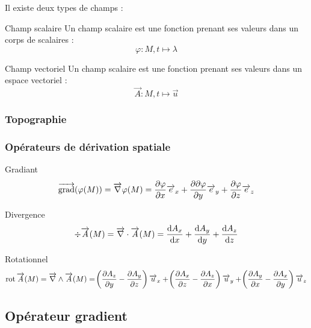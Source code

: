 \documentclass[a4paper,french,bookmarks]{book}
\begin{document}
    Il existe deux types de champs :
    
    \begin{definition}{Champ scalaire}{}
        Un champ scalaire est une fonction prenant ses valeurs dans un corps de scalaires :
        \[ \varphi : M, t \mapsto \lambda \]
    \end{definition}
    
    \begin{definition}{Champ vectoriel}{}
        Un champ scalaire est une fonction prenant ses valeurs dans un espace vectoriel :
        \[ \vec{A} : M, t \mapsto \vec{u} \]
    \end{definition}
    
    \subsubsection{Topographie}
    
    \subsubsection{Opérateurs de dérivation spatiale}
    
    \begin{definition}{Gradiant}{}
        \[ \overrightarrow{\operatorname{grad}}\!\left(\varphi\!\left(M\right)\right) = \overrightarrow{\nabla}\varphi\!\left(M\right) = \dfrac{\partial \varphi}{\partial x}\overrightarrow{e}_x + \dfrac{\partial \partial \varphi}{\partial y}\overrightarrow{e}_y + \dfrac{\partial \varphi}{\partial z}\overrightarrow{e}_z \]
    \end{definition}
    
    \begin{definition}{Divergence}{}
        \[ \div\overrightarrow{A}\!\left(M\right) = \overrightarrow{\nabla} \cdot \overrightarrow{A}\!\left(M\right) = \dfrac{\mathrm d A_x}{\mathrm d x} + \dfrac{\mathrm d A_y}{\mathrm d y} + \dfrac{\mathrm d A_z}{\mathrm d z} \]
    \end{definition}
    
    \begin{definition}{Rotationnel}{}
        \[ \operatorname{rot}\overrightarrow{A}\!\left(M\right) = \overrightarrow{\nabla} \land \overrightarrow{A}\!\left(M\right) = \!\left(\dfrac{\partial A_z}{\partial y} - \dfrac{\partial A_y}{\partial z}\right)\overrightarrow{u}_x + \!\left(\dfrac{\partial A_x}{\partial z} - \dfrac{\partial A_z}{\partial x}\right)\overrightarrow{u}_y + \!\left(\dfrac{\partial A_y}{\partial x} - \dfrac{\partial A_x}{\partial y}\right)\overrightarrow{u}_z \]
    \end{definition}
    
    \subsection{Opérateur gradient}
    
\end{document}
